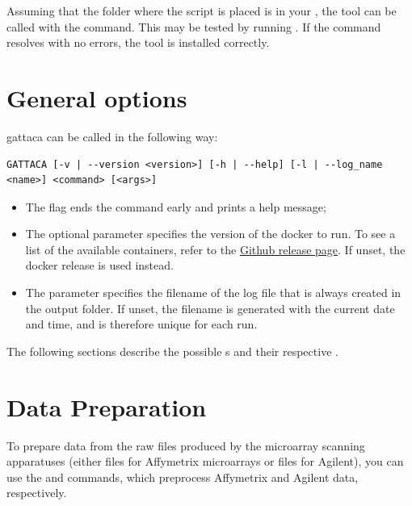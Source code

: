 Assuming that the folder where the script is placed is in your , the tool can be called with the  command. This may be tested by running . If the command resolves with no errors, the tool is installed correctly.

\section{General options}
\gls{gattaca} can be called in the following way:
\begin{lstlisting}[style=ShellStyle]
GATTACA [-v | --version <version>] [-h | --help] [-l | --log_name <name>] <command> [<args>]
\end{lstlisting}

\begin{itemize}
    \item The  flag ends the command early and prints a help message;
    \item The  optional parameter specifies the version of the docker to run. To see a list of the available containers, refer to the \href{https://github.com/Feat-FeAR/GATTACA/releases}{Github release page}. If unset, the  docker release is used instead.
    \item The  parameter specifies the filename of the log file that is always created in the output folder. If unset, the filename is generated with the current date and time, and is therefore unique for each run.
\end{itemize}


The following sections describe the possible s and their respective .

\section{Data Preparation}

To prepare data from the raw files produced by the microarray scanning apparatuses (either  files for Affymetrix microarrays or  files for Agilent), you can use the  and  commands, which preprocess Affymetrix and Agilent data, respectively.

